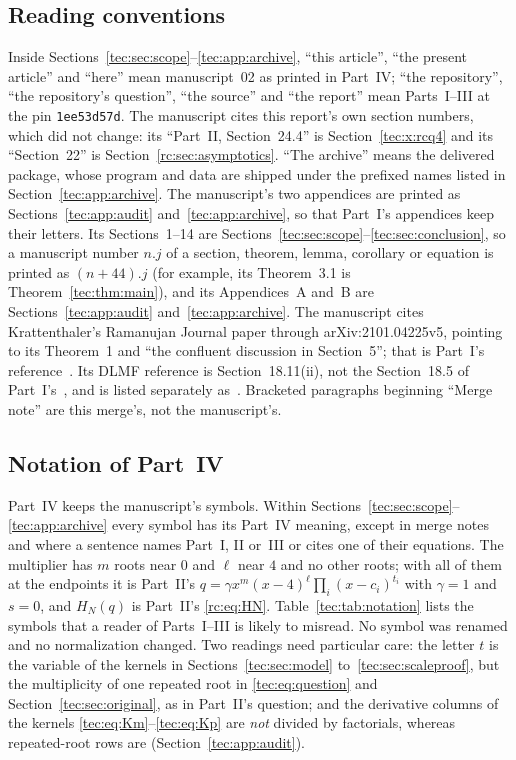 \documentclass[11pt,a4paper]{article}
\numberwithin{equation}{section}
\theoremstyle{definition}
\theoremstyle{remark}
\begin{document}
\subsection{Reading conventions}\label{tec:sec:reading}
Inside Sections~\ref{tec:sec:scope}--\ref{tec:app:archive}, ``this
article'', ``the present article'' and ``here'' mean manuscript~02 as
printed in Part~IV; ``the repository'', ``the repository's question'',
``the source'' and ``the report'' mean Parts~I--III at the pin
\texttt{1ee53d57d}.  The manuscript cites this report's own section
numbers, which did not change: its ``Part~II, Section~24.4'' is
Section~\ref{tec:x:rcq4} and its ``Section~22'' is
Section~\ref{rc:sec:asymptotics}.  ``The archive'' means the delivered
package, whose program and data are shipped under the prefixed names
listed in Section~\ref{tec:app:archive}.  The manuscript's two appendices
are printed as Sections~\ref{tec:app:audit} and~\ref{tec:app:archive}, so
that Part~I's appendices keep their letters.  Its Sections~1--14 are
Sections~\ref{tec:sec:scope}--\ref{tec:sec:conclusion}, so a manuscript
number $n.j$ of a section, theorem, lemma, corollary or equation is
printed as $(n+44).j$ (for example, its Theorem~3.1 is
Theorem~\ref{tec:thm:main}), and its Appendices~A and~B are
Sections~\ref{tec:app:audit} and~\ref{tec:app:archive}.  The manuscript
cites Krattenthaler's Ramanujan Journal paper through arXiv:2101.04225v5,
pointing to its Theorem~1 and ``the confluent discussion in Section~5'';
that is Part~I's reference~\cite{Krattenthaler2023}.  Its DLMF reference is
Section~18.11(ii), not the Section~18.5 of Part~I's~\cite{DLMF}, and is
listed separately as~\cite{DLMFMehlerHeine}.  Bracketed paragraphs
beginning ``Merge note'' are this merge's, not the manuscript's.

\subsection{Notation of Part~IV}\label{tec:sec:notation}
Part~IV keeps the manuscript's symbols.  Within
Sections~\ref{tec:sec:scope}--\ref{tec:app:archive} every symbol has its
Part~IV meaning, except in merge notes and where a sentence names
Part~I, II or~III or cites one of their equations.  The multiplier has
$m$ roots near $0$ and $\ell$ near $4$ and no other roots; with all of
them at the endpoints it is Part~II's
$q=\gamma x^m(x-4)^\ell\prod_i(x-c_i)^{t_i}$ with $\gamma=1$ and $s=0$,
and $H_N(q)$ is Part~II's \eqref{rc:eq:HN}.
Table~\ref{tec:tab:notation} lists the symbols that a reader of
Parts~I--III is likely to misread.  No symbol was renamed and no
normalization changed.  Two readings need particular care: the letter $t$
is the variable of the kernels in Sections~\ref{tec:sec:model}
to~\ref{tec:sec:scaleproof}, but the multiplicity of one repeated root in
\eqref{tec:eq:question} and Section~\ref{tec:sec:original}, as in
Part~II's question; and the derivative columns of the kernels
\eqref{tec:eq:Km}--\eqref{tec:eq:Kp} are \emph{not} divided by factorials,
whereas repeated-root rows are (Section~\ref{tec:app:audit}).
\end{document}
